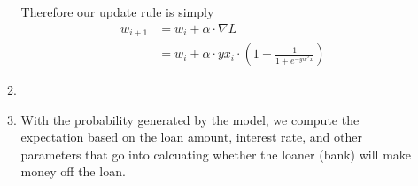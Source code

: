 \documentclass{article}
\begin{document}
\begin{enumerate}
\begin{enumerate}
                Therefore our update rule is simply
                \begin{align*}
                    w_{i+1} 
                        &= w_i + \alpha \cdot \nabla L \\
                        &= w_i + \alpha \cdot yx_i \cdot \left( 1 - 
                            \frac{1}{1 + e^{-yw^Tx}} \right)
                \end{align*}
            \item %
            \item %
                With the probability generated by the model, we compute
                the expectation based on the loan amount, interest rate, 
                and other parameters that go into calcuating whether the 
                loaner (bank) will make money off the loan.
        \end{enumerate}
\end{enumerate}
\end{document}
